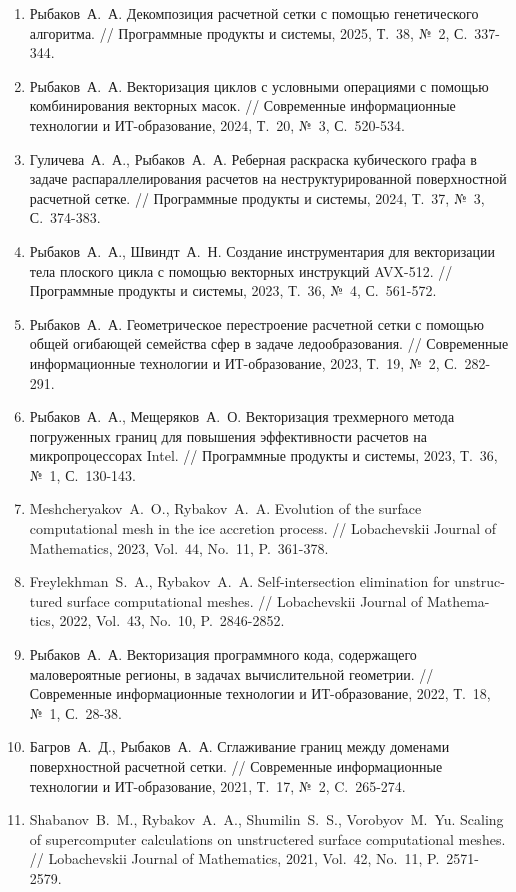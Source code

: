 \documentclass[a4paper,14pt]{extarticle}                     %
\theoremstyle{plain}                                         %
\begin{document}
\begin{enumerate}[noitemsep,topsep=0pt,parsep=0pt,partopsep=0pt]
\item Рыбаков~А.~А. Декомпозиция расчетной сетки с помощью генетического алгоритма. // Программные продукты и системы, 2025, Т.~38, №~2, С.~337-344.
\item Рыбаков~А.~А. Векторизация циклов с условными операциями с помощью комбинирования векторных масок. // Современные информационные технологии и ИТ-образование, 2024, Т.~20, №~3, С.~520-534.
\item Гуличева~А.~А., Рыбаков~А.~А. Реберная раскраска кубического графа в задаче распараллелирования расчетов на неструктурированной поверхностной расчетной сетке. // Программные продукты и системы, 2024, Т.~37, №~3, С.~374-383.
\item Рыбаков~А.~А., Швиндт~А.~Н. Создание инструментария для векторизации тела плоского цикла с помощью векторных инструкций AVX-512. // Программные продукты и системы, 2023, Т.~36, №~4, С.~561-572.
\item Рыбаков~А.~А. Геометрическое перестроение расчетной сетки с помощью общей огибающей семейства сфер в задаче ледообразования. // Современные информационные технологии и ИТ-образование, 2023, Т.~19, №~2, С.~282-291.
\item Рыбаков~А.~А., Мещеряков~А.~О. Векторизация трехмерного метода погруженных границ для повышения эффективности расчетов на микропроцессорах Intel. // Программные продукты и системы, 2023, Т.~36, №~1, С.~130-143.
\item Meshcheryakov~A.~O., Rybakov~A.~A. Evolution of the surface computational mesh in the ice accretion process. // Lobachevskii Journal of Mathematics, 2023, Vol.~44, No.~11, P.~361-378.
\item Freylekhman~S.~A., Rybakov~A.~A. Self-intersection elimination for unstruc-tured surface computational meshes. // Lobachevskii Journal of Mathema-tics, 2022, Vol.~43, No.~10, P.~2846-2852.
\item Рыбаков~А.~А. Векторизация программного кода, содержащего маловероятные регионы, в задачах вычислительной геометрии. // Современные информационные технологии и ИТ-образование, 2022, Т.~18, №~1, С.~28-38.
\item Багров~А.~Д., Рыбаков~А.~А. Сглаживание границ между доменами поверхностной расчетной сетки. // Современные информационные технологии и ИТ-образование, 2021, Т.~17, №~2, C.~265-274.
\item Shabanov~B.~M., Rybakov~A.~A., Shumilin~S.~S., Vorobyov~M.~Yu. Scaling of supercomputer calculations on unstructered surface computational meshes. // Lobachevskii Journal of Mathematics, 2021, Vol.~42, No.~11, P.~2571-2579.

\end{enumerate}
\end{document}
